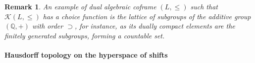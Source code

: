 \documentclass{article}
\newcommand{\comm}[2]{\begin{tcolorbox}[colback=gray!40]\textbf{Comment} (#1) : #2\end{tcolorbox}}
\newtheorem{remark}[theorem]{Remark}
\begin{document}






\begin{remark}
    An example of dual algebraic coframe $(L,\le)$ such that $\mathcal{K}(L,\le)$ has a choice function is the lattice of subgroups of the additive group $(\mathbb Q, +)$ with order $\supset$, for instance, as its dually compact elements are the finitely generated subgroups, forming a countable set. 
\end{remark}

\paragraph{Hausdorff topology on the hyperspace of shifts}
\end{document}
